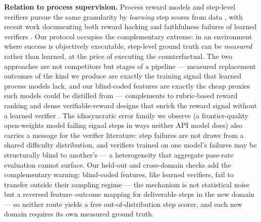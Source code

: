 \textbf{Relation to process supervision.} Process reward models and step-level verifiers pursue the same granularity by \emph{learning} step scores from data \cite{zhang2025groundedprm,zhang2025linking,rahman2025scaleprm,samarinas2026truncated,liu2026confspec,zhou2026silr}, with recent work documenting both reward hacking and faithfulness failures of learned verifiers \cite{ma2024what,nie2026stop,zhang2026when}. Our protocol occupies the complementary extreme: in an environment where success is objectively executable, step-level ground truth can be \emph{measured} rather than learned, at the price of executing the counterfactual. The two approaches are not competitors but stages of a pipeline --- measured replacement outcomes of the kind we produce are exactly the training signal that learned process models lack, and our blind-coded features are exactly the cheap proxies such models could be distilled from --- complements to rubric-based reward ranking and dense verifiable-reward designs that enrich the reward signal without a learned verifier \cite{li2026rlvr,wang2026beyond}. The idiosyncratic error family we observe (a frontier-quality open-weights model failing signal steps in ways neither API model does) also carries a message for the verifier literature: step failures are not draws from a shared difficulty distribution, and verifiers trained on one model's failures may be structurally blind to another's --- a heterogeneity that aggregate pass-rate evaluation cannot surface. Our held-out and cross-domain checks add the complementary warning: blind-coded features, like learned verifiers, fail to transfer outside their sampling regime --- the mechanism is not statistical noise but a reversed feature--outcome mapping for deliverable steps in the new domain --- so neither route yields a free out-of-distribution step scorer, and each new domain requires its own measured ground truth.

